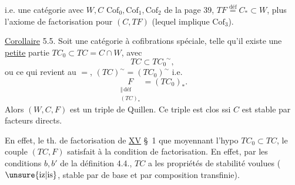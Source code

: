 
i.e. une catégorie avec $W,C$  
$\mathrm{Cof}_{0},\mathrm{Cof}_{1},\mathrm{Cof}_{2}$ de la page 39,  $TF\overset{\mathrm{déf}}=C_{*}\subset W$,
plus l'axiome de factorisation pour $(C,TF)$
(lequel implique $\mathrm{Cof}_{3}$).

\uline{Corollaire} 5.5. Soit   une catégorie à cofibrations
spéciale, telle qu'il existe une \uline{petite}
partie $TC_{0}\subset TC=C\cap W$, avec
\[
TC\subset {TC_{0}}^{\sim}, \tag*{(5.5.1)}
\]
ou ce qui revient au $=$, $(TC)^{\sim}=(TC_{0})^{\sim}$ i.e.
\[
\underset{\substack{\Vert\,\mathrm{déf}\\(TC)_{*}}}{F}=(TC_{0})_{*}.\tag*{(5.5.2)}
\]
Alors  $(W,C,F)$ est un triple de
Quillen.  Ce triple est clos ssi $C$ est
stable par facteurs directs.

En effet, le th. de factorisation de
\uline{XV} \S~1  que moyennant l'hypo 
 $TC_{0}\subset TC$, le couple $(TC,F)$ 
satisfait à la condition de factorisation.
En effet, par les conditions $b,b'$ de la
définition 4.4., $TC$ a les propriétés de
stabilité voulues ( $\unsure{\mathrm{iz}|\mathrm{is}}$, stable par
 de base et par composition transfinie).

